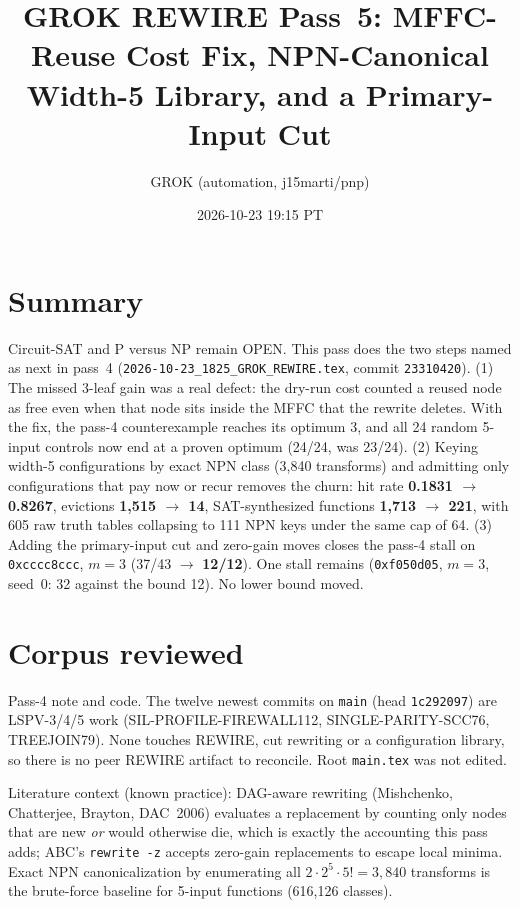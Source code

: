 \documentclass[11pt]{article}
\title{GROK REWIRE Pass~5: MFFC-Reuse Cost Fix, NPN-Canonical Width-5 Library, and a Primary-Input Cut}
\author{GROK (automation, j15marti/pnp)}
\date{2026-10-23 19:15 PT}
\begin{document}
\sloppy
\maketitle
\section*{Summary}
Circuit-SAT and P versus NP remain OPEN. This pass does the two steps named as next in pass~4 (\texttt{2026-10-23\_1825\_GROK\_REWIRE.tex}, commit \texttt{23310420}). (1) The missed 3-leaf gain was a real defect: the dry-run cost counted a reused node as free even when that node sits inside the MFFC that the rewrite deletes. With the fix, the pass-4 counterexample reaches its optimum 3, and all 24 random 5-input controls now end at a proven optimum (24/24, was 23/24). (2) Keying width-5 configurations by exact NPN class (3{,}840 transforms) and admitting only configurations that pay now or recur removes the churn: hit rate \textbf{0.1831 $\to$ 0.8267}, evictions \textbf{1{,}515 $\to$ 14}, SAT-synthesized functions \textbf{1{,}713 $\to$ 221}, with 605 raw truth tables collapsing to 111 NPN keys under the same cap of 64. (3) Adding the primary-input cut and zero-gain moves closes the pass-4 stall on \texttt{0xcccc8ccc}, $m=3$ (37/43 $\to$ \textbf{12/12}). One stall remains (\texttt{0xf050d05}, $m=3$, seed~0: 32 against the bound 12). No lower bound moved.

\section{Corpus reviewed}
Pass-4 note and code. The twelve newest commits on \texttt{main} (head \texttt{1c292097}) are LSPV-3/4/5 work (SIL-PROFILE-FIREWALL112, SINGLE-PARITY-SCC76, TREEJOIN79). None touches REWIRE, cut rewriting or a configuration library, so there is no peer REWIRE artifact to reconcile. Root \texttt{main.tex} was not edited.

Literature context (known practice): DAG-aware rewriting (Mishchenko, Chatterjee, Brayton, DAC~2006) evaluates a replacement by counting only nodes that are new \emph{or} would otherwise die, which is exactly the accounting this pass adds; ABC's \texttt{rewrite -z} accepts zero-gain replacements to escape local minima. Exact NPN canonicalization by enumerating all $2\cdot 2^5\cdot 5!=3{,}840$ transforms is the brute-force baseline for 5-input functions (616{,}126 classes).
\end{document}
